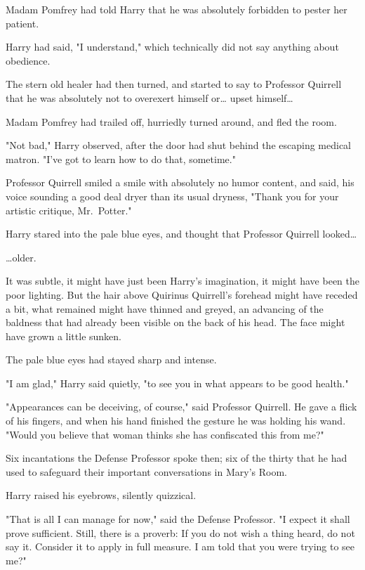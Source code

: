 Madam Pomfrey had told Harry that he was absolutely forbidden to pester her 
patient.

Harry had said, "I understand," which technically did not say anything about 
obedience.

The stern old healer had then turned, and started to say to Professor Quirrell 
that he was absolutely not to overexert himself or{\ldots} upset himself{\ldots}

Madam Pomfrey had trailed off, hurriedly turned around, and fled the room.

"Not bad," Harry observed, after the door had shut behind the escaping medical 
matron. "I've got to learn how to do that, sometime."

Professor Quirrell smiled a smile with absolutely no humor content, and said, 
his voice sounding a good deal dryer than its usual dryness, "Thank you for 
your artistic critique, Mr.~Potter."

Harry stared into the pale blue eyes, and thought that Professor Quirrell 
looked{\ldots}

{\ldots}older.

It was subtle, it might have just been Harry's imagination, it might have been 
the poor lighting. But the hair above Quirinus Quirrell's forehead might have 
receded a bit, what remained might have thinned and greyed, an advancing of the 
baldness that had already been visible on the back of his head. The face might 
have grown a little sunken.

The pale blue eyes had stayed sharp and intense.

"I am glad," Harry said quietly, "to see you in what appears to be good health."

"Appearances can be deceiving, of course," said Professor Quirrell. He gave a 
flick of his fingers, and when his hand finished the gesture he was holding his 
wand. "Would you believe that woman thinks she has confiscated this from me?"

Six incantations the Defense Professor spoke then; six of the thirty that he 
had used to safeguard their important conversations in Mary's Room.

Harry raised his eyebrows, silently quizzical.

"That is all I can manage for now," said the Defense Professor. "I expect it 
shall prove sufficient. Still, there is a proverb: If you do not wish a thing 
heard, do not say it. Consider it to apply in full measure. I am told that you 
were trying to see me?"

